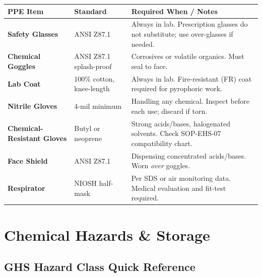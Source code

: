 \documentclass[11pt,a4paper]{article}
\begin{document}
\begin{tabularx}{\linewidth}{@{}>{\bfseries}l l >{\raggedright\arraybackslash}X@{}}
  \rowcolor{accent}
  \color{white}PPE Item & \color{white}Standard & \color{white}Required When / Notes \\
  \midrule
  Safety Glasses   & ANSI Z87.1              & Always in lab. Prescription glasses do not substitute; use over-glasses if needed. \\
  Chemical Goggles & ANSI Z87.1 splash-proof & Corrosives or volatile organics. Must seal to face. \\
  Lab Coat         & 100\% cotton, knee-length & Always in lab. Fire-resistant (FR) coat required for pyrophoric work. \\
  Nitrile Gloves   & 4-mil minimum           & Handling any chemical. Inspect before each use; discard if torn. \\
  Chemical-Resistant Gloves & Butyl or neoprene & Strong acids/bases, halogenated solvents. Check SOP-EHS-07 compatibility chart. \\
  Face Shield      & ANSI Z87.1              & Dispensing concentrated acids/bases. Worn \textit{over} goggles. \\
  Respirator       & NIOSH half-mask         & Per SDS or air monitoring data. Medical evaluation and fit-test required. \\
\end{tabularx}

\section{Chemical Hazards \& Storage}

\subsection{GHS Hazard Class Quick Reference}
\end{document}
